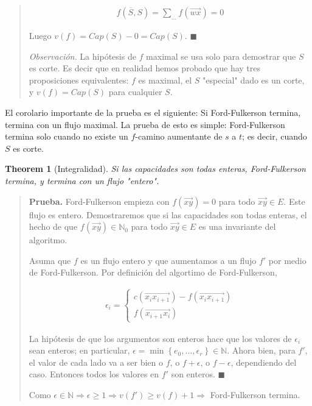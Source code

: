 \documentclass[a4paper]{article}
\newtheorem{theorem}{Theorem}
\newtheorem{theorem}{Theorem}
\begin{document}
\begin{quote}
\begin{align*}
    f(\overline{S}, S) = \sum_{\ldots} f(\overrightarrow{wx}) = 0
\end{align*}

Luego $v(f) = Cap(S) - 0 = Cap(S)$. $\blacksquare$

\textit{Observación.} La hipótesis de $f$ maximal se usa solo para demostrar que $S$
es corte. Es decir que en realidad hemos probado que hay tres proposiciones
equivalentes: $f$ es maximal, el $S$ "especial" dado es un corte, y $v(f) =
Cap(S)$ para cualquier $S$.

\end{quote}
\normalsize

El corolario importante de la prueba es el siguiente: Si Ford-Fulkerson termina,
termina con un flujo maximal. La prueba de esto es simple: Ford-Fulkerson
termina solo cuando no existe un $f$-camino aumentante de $s$ a $t$; es decir,
cuando $S$ es corte.

\begin{theorem}[Integralidad]
    Si las capacidades son todas enteras, Ford-Fulkerson termina, y termina con
    un flujo "entero".
\end{theorem}


\small
\begin{quote}

\textbf{Prueba.} Ford-Fulkerson empieza con $f(\overrightarrow{xy}) = 0$ para
todo $\overrightarrow{xy} \in E$. Este flujo es entero. Demostraremos que si las
capacidades son todas enteras, el hecho de que $f(\overrightarrow{xy}) \in
\mathbb{N}_0$ para todo $\overrightarrow{xy} \in E$ es una invariante del
algoritmo.

Asuma que $f$ es un flujo entero y que aumentamos a un flujo $f'$ por medio de
Ford-Fulkerson. Por definición del algortimo de Ford-Fulkerson, 

\begin{align*}
    \epsilon_i = \begin{cases}
        c(\overrightarrow{x_i x_{i+1}}) - f(\overrightarrow{x_i x_{i+1}}) \\  
        f(\overrightarrow{x_{i+1}x_i})
    \end{cases}
\end{align*}

La hipótesis de que los argumentos son enteros hace que los valores de
$\epsilon_i$ sean enteros; en particular, $\epsilon = \min \left\{ e_0, \ldots,
\epsilon_r \right\} \in \mathbb{N}$. Ahora bien, para $f'$, el valor de cada
lado va a ser bien o $f$, o $f + \epsilon$, o $f - \epsilon$, dependiendo del
caso. Entonces todos los valores en $f'$ son enteros. $\blacksquare$

Como $\epsilon \in \mathbb{N} \Rightarrow \epsilon \geq 1 \Rightarrow v(f') \geq
v(f) + 1 \Rightarrow $ Ford-Fulkerson termina.

\end{quote}
\normalsize
\end{document}
